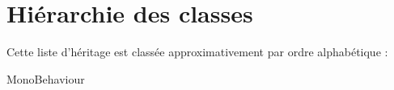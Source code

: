 \section{Hiérarchie des classes}
Cette liste d'héritage est classée approximativement par ordre alphabétique \+:\begin{DoxyCompactList}
\item {}
\item {}
\item Mono\+Behaviour\begin{DoxyCompactList}
\item {}
\item {}
\item {}
\end{DoxyCompactList}
\end{DoxyCompactList}
